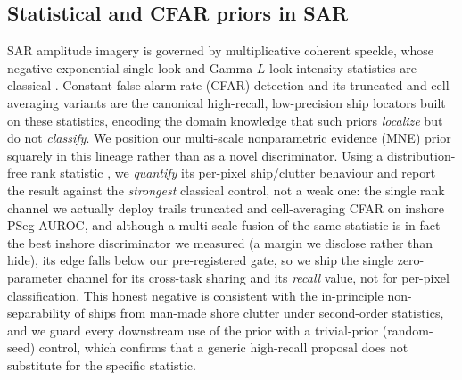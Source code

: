 \subsection{Statistical and CFAR priors in SAR}
SAR amplitude imagery is governed by multiplicative coherent speckle, whose negative-exponential single-look and Gamma $L$-look intensity statistics are classical \cite{goodman1976speckle,oliver2004sar}. Constant-false-alarm-rate (CFAR) detection \cite{finn1968cfar} and its truncated and cell-averaging variants are the canonical high-recall, low-precision ship locators built on these statistics, encoding the domain knowledge that such priors \emph{localize} but do not \emph{classify}. We position our multi-scale nonparametric evidence (MNE) prior squarely in this lineage rather than as a novel discriminator. Using a distribution-free rank statistic \cite{mann1947whitney}, we \emph{quantify} its per-pixel ship/clutter behaviour and report the result against the \emph{strongest} classical control, not a weak one: the single rank channel we actually deploy trails truncated and cell-averaging CFAR on inshore PSeg AUROC, and although a multi-scale fusion of the same statistic is in fact the best inshore discriminator we measured (a margin we disclose rather than hide), its edge falls below our pre-registered gate, so we ship the single zero-parameter channel for its cross-task sharing and its \emph{recall} value, not for per-pixel classification. This honest negative is consistent with the in-principle non-separability of ships from man-made shore clutter under second-order statistics, and we guard every downstream use of the prior with a trivial-prior (random-seed) control, which confirms that a generic high-recall proposal does not substitute for the specific statistic.


